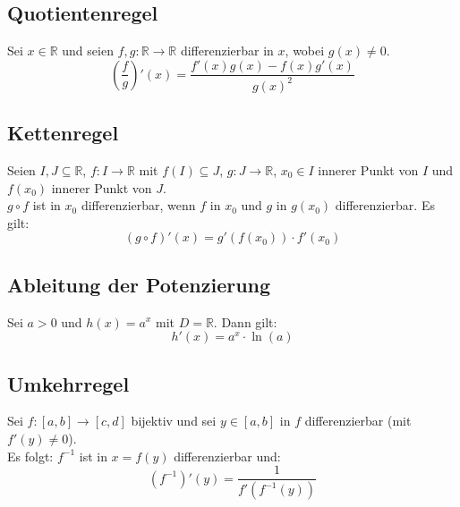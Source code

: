 \documentclass[halfparscip]{scrartcl}
\newcounter{subsection2}
\begin{document}
\subsection{Quotientenregel}
Sei $x \in \mathbb{R}$ und seien $f, g: \mathbb{R} \rightarrow \mathbb{R}$ differenzierbar in $x$, wobei $g(x) \neq 0$.\\
\begin{equation*}
	\left(\frac{f}{g}\right)'(x) = \frac{f'(x)g(x) - f(x)g'(x)}{g(x)^2}
\end{equation*}

\subsection{Kettenregel}
Seien $I, J \subseteq \mathbb{R}$, $f: I \rightarrow \mathbb{R}$ mit $f(I) \subseteq J$, $g: J \rightarrow \mathbb{R}$, $x_0 \in I$ innerer Punkt von $I$ und $f(x_0)$ innerer Punkt von $J$.\\
$g \circ f$ ist in $x_0$ differenzierbar, wenn $f$ in $x_0$ und $g$ in $g(x_0)$ differenzierbar. Es gilt:
\begin{equation*}
	(g \circ f)'(x) = g'(f(x_0)) \cdot f'(x_0)
\end{equation*}

\subsection{Ableitung der Potenzierung}
Sei $a > 0$ und $h(x) = a^x$ mit $D = \mathbb{R}$. Dann gilt:
\begin{equation*}
	h'(x)=a^x\cdot \ln(a)
\end{equation*}

\addtocounter{subsection}{2}
\subsection{Umkehrregel}
Sei $f: [a, b] \rightarrow [c, d]$ bijektiv und sei $y \in [a, b]$ in $f$ differenzierbar (mit $f'(y) \neq 0$).\\
Es folgt: $f^{-1}$ ist in $x = f(y)$ differenzierbar und:
\begin{equation*}
	\left(f^{-1}\right)'(y) = \frac{1}{f'\left(f^{-1}(y)\right)}
\end{equation*}

\addtocounter{subsection}{3}
\end{document}
